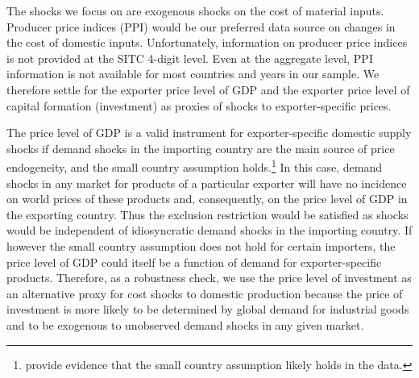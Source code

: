 \documentclass[12pt,twoside,a4paper,notitlepage]{article}
\begin{document}
The shocks we focus on are exogenous shocks on the cost of material inputs.
Producer price indices (PPI) would be our preferred data source on changes in the cost of domestic inputs. Unfortunately, information on producer price indices is not provided at the SITC 4-digit level. 
Even at the aggregate level, PPI information is not available for most countries and years in our sample.
We therefore settle for the exporter price level of GDP and the exporter price level of capital formation (investment) as proxies of shocks to exporter-specific prices. 

The price level of GDP is a valid instrument for exporter-specific domestic supply shocks if demand shocks in the importing country are the main source of price endogeneity, and the small country assumption holds.\footnote{\cite{Magee2008} provide evidence that the small country assumption likely holds in the data.}
In this case, demand shocks in any market for products of a particular exporter will have no incidence on world prices of these products and, consequently, on the price level of GDP in the exporting country.
Thus the exclusion restriction would be satisfied as shocks would be independent of idiosyncratic demand shocks in the importing country.
If however the small country assumption does not hold for certain importers, the price level of GDP could itself be a function of demand for exporter-specific products.
Therefore, as a robustness check, we use the price level of investment as an alternative proxy for cost shocks to domestic production because the price of investment is more likely to be determined by global demand for industrial goods and to be exogenous to unobserved demand shocks in any given market.
\end{document}
